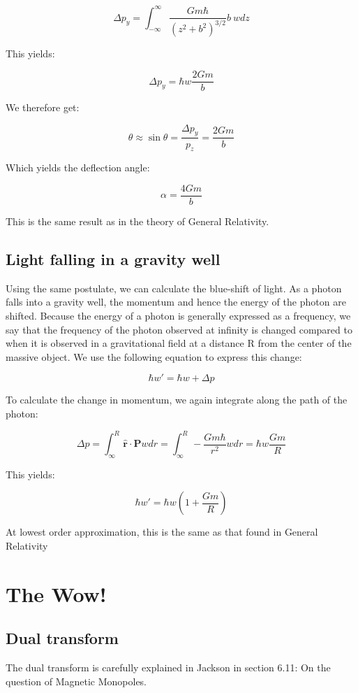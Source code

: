 \documentclass {article}
\renewcommand\vec{\mathbf}
\let\OldHat\hat
\renewcommand{\hat}[1]{\OldHat{\mathbf{#1}}}
\begin{document}
$$\Delta p_y = \int_{-\infty}^{\infty}  \frac {Gm\hbar}{(z^2 + b^2)^{3/2}} b ~ wdz $$

This yields:

$$\Delta p_y = \hbar w \frac {2Gm} b$$

We therefore get:

$$\theta \approx \sin \theta = \frac {\Delta p_y}{p_z} = \frac {2Gm} b$$

Which yields the deflection angle:

$$\alpha = \frac {4Gm} b$$

This is the same result as in the theory of General Relativity.

\newpage
\subsection{Light falling in a gravity well}

Using the same postulate, we can calculate the blue-shift of light. As a photon falls into a gravity well, the momentum and hence the energy of the photon are shifted. Because the energy of a photon is generally expressed as a frequency, we say that the frequency of the photon observed at infinity is changed compared to when it is observed in a gravitational field at a distance R from the center of the massive object. We use the following equation to express this change:

$$\hbar w' = \hbar w + \Delta p $$

To calculate the change in momentum, we again integrate along the path of the photon:

$$\Delta p = \int_{\infty}^R \hat r \cdot \vec P w dr= \int_{\infty}^R - \frac {Gm\hbar}{r^2} w dr = \hbar w \frac {Gm}R $$

This yields:

$$\hbar w' = \hbar w \left( 1 + \frac {Gm}R \right) $$

At lowest order approximation, this is the same as that found in General Relativity

\newpage

\section{The Wow!}
\subsection{Dual transform}

The dual transform is carefully explained in Jackson in section 6.11: On the question of Magnetic Monopoles.
\end{document}
